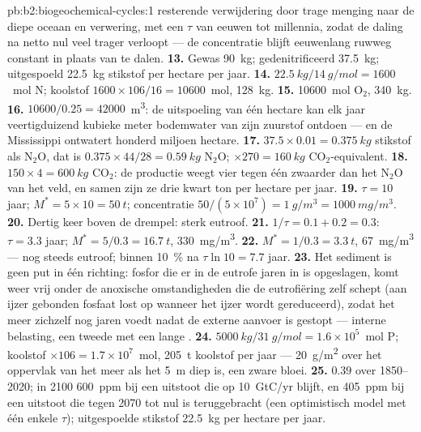 \begin{solution}{pb:b2:biogeochemical-cycles:1}
resterende verwijdering door trage menging naar de diepe oceaan en verwering,
met een $\tau$ van eeuwen tot millennia, zodat de daling na netto nul veel
trager verloopt --- de concentratie blijft eeuwenlang ruwweg constant in plaats
van te dalen.
\textbf{13.} Gewas \qty{90}{kg}; gedenitrificeerd \qty{37.5}{kg}; uitgespoeld
\qty{22.5}{kg} stikstof per hectare per jaar.
\textbf{14.} $\qty{22.5}{kg}/\qty{14}{g/mol} = 1600$~mol N; koolstof
$1600\times 106/16 = \num{10600}$~mol, \qty{128}{kg}.
\textbf{15.} \num{10600}~mol $\mathrm{O_2}$, \qty{340}{kg}.
\textbf{16.} $\num{10600}/0.25 = \num{42000}$~\unit{m^3}: de uitspoeling van
één hectare kan elk jaar veertigduizend kubieke meter bodemwater van zijn
zuurstof ontdoen --- en de Mississippi ontwatert honderd miljoen hectare.
\textbf{17.} $37.5\times 0.01 = \qty{0.375}{kg}$ stikstof als
$\mathrm{N_2O}$, dat is $0.375\times 44/28 = \qty{0.59}{kg}$ $\mathrm{N_2O}$;
$\times 270 = \qty{160}{kg}$ $\mathrm{CO_2}$-equivalent.
\textbf{18.} $150\times 4 = \qty{600}{kg}$ $\mathrm{CO_2}$: de productie weegt
vier tegen één zwaarder dan het $\mathrm{N_2O}$ van het veld, en samen zijn ze
drie kwart ton per hectare per jaar.
\textbf{19.} $\tau = 10$ jaar; $M^{*} = 5\times 10 = \qty{50}{t}$;
concentratie $50/(5\times 10^{7}) = \qty{1}{g/m^3} =
\qty{1000}{mg/m^3}$.
\textbf{20.} Dertig keer boven de drempel: sterk eutroof.
\textbf{21.} $1/\tau = 0.1 + 0.2 = 0.3$: $\tau = 3.3$ jaar; $M^{*} =
5/0.3 = \qty{16.7}{t}$, \qty{330}{mg/m^3}.
\textbf{22.} $M^{*} = 1/0.3 = \qty{3.3}{t}$, \qty{67}{mg/m^3} --- nog steeds
eutroof; binnen \qty{10}{\%} na $\tau\ln 10 = 7.7$ jaar.
\textbf{23.} Het sediment is geen put in één richting: fosfor die er in de
eutrofe jaren in is opgeslagen, komt weer vrij onder de anoxische
omstandigheden die de eutrofiëring zelf schept (aan ijzer gebonden
fosfaat lost op wanneer het ijzer wordt gereduceerd), zodat het meer zichzelf
nog jaren voedt nadat de externe aanvoer is gestopt --- interne belasting, een
tweede  met een lange .
\textbf{24.} $\qty{5000}{kg}/\qty{31}{g/mol} = 1.6\times 10^{5}$~mol P;
koolstof $\times 106 = 1.7\times 10^{7}$~mol, \qty{205}{t} koolstof per
jaar --- \qty{20}{g/m^2} over het oppervlak van het meer als het
\qty{5}{m} diep is, een zware bloei.
\textbf{25.}  $0.39$ over 1850--2020; in 2100
\qty{600}{ppm} bij een uitstoot die op \qty{10}{GtC/yr} blijft, en
\qty{405}{ppm} bij een uitstoot die tegen 2070 tot nul is teruggebracht (een
optimistisch model met één enkele $\tau$); uitgespoelde stikstof \qty{22.5}{kg}
per hectare per jaar.
\end{solution}
